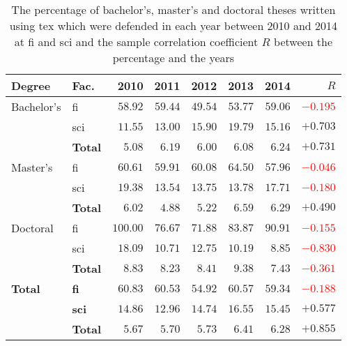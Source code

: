 \begin{table}
  \caption{The percentage of bachelor's, master's and doctoral theses written using \gls{tex} which were defended in each year between 2010 and 2014 at \acrshort{fi} and \acrshort{sci} and the sample correlation coefficient $R$ between the percentage and the years}
  \begin{tabularx}{\textwidth}{Xlrrrrrr}
    \textbf{Degree} & \textbf{Fac.} & \textbf{2010} & \textbf{2011} & \textbf{2012} & \textbf{2013} & \textbf{2014} & $R$\\
    \hline
    Bachelor's
      & \acrshort{fi}  & $58.92$ & $59.44$ & $49.54$ & $53.77$ & $59.06$ & \textcolor{red}{$-0.195$} \\
      & \acrshort{sci} & $11.55$ & $13.00$ & $15.90$ & $19.79$ & $15.16$ & \textcolor{OliveGreen}{$+0.703$} \\
      & \textbf{Total} & $\mathbf{5.08}$ & $\mathbf{6.19}$ & $\mathbf{6.00}$ & $\mathbf{6.08}$ & $\mathbf{6.24}$ & \textcolor{OliveGreen}{$\mathbf{+0.731}$} \\
    Master's
      & \acrshort{fi}  & $60.61$ & $59.91$ & $60.08$ & $64.50$ & $57.96$ & \textcolor{red}{$-0.046$} \\
      & \acrshort{sci} & $19.38$ & $13.54$ & $13.75$ & $13.78$ & $17.71$ & \textcolor{red}{$-0.180$} \\
      & \textbf{Total} & $\mathbf{6.02}$ & $\mathbf{4.88}$ & $\mathbf{5.22}$ & $\mathbf{6.59}$ & $\mathbf{6.29}$ &  \textcolor{OliveGreen}{$\mathbf{+0.490}$} \\
    Doctoral
      & \acrshort{fi}  & $100.00$ & $76.67$ & $71.88$ & $83.87$ & $90.91$ & \textcolor{red}{$-0.155$} \\
      & \acrshort{sci} & $18.09$  & $10.71$ & $12.75$ & $10.19$ & $8.85$ & \textcolor{red}{$-0.830$} \\
      & \textbf{Total} & $\mathbf{8.83}$ & $\mathbf{8.23}$ & $\mathbf{8.41}$ & $\mathbf{9.38}$ & $\mathbf{7.43}$ & \textcolor{red}{$\mathbf{-0.361}$} \\
    \hline
    \textbf{Total} 
      & \textbf{\acrshort{fi} } & $\mathbf{60.83}$ & $\mathbf{60.53}$ & $\mathbf{54.92}$ & $\mathbf{60.57}$ & $\mathbf{59.34}$ & \textcolor{red}{$\mathbf{-0.188}$} \\
      & \textbf{\acrshort{sci}} & $\mathbf{14.86}$ & $\mathbf{12.96}$ & $\mathbf{14.74}$ & $\mathbf{16.55}$ & $\mathbf{15.45}$ & \textcolor{OliveGreen}{$\mathbf{+0.577}$} \\
      & \textbf{Total} &$\mathbf{5.67}$ & $\mathbf{5.70}$ & $\mathbf{5.73}$ & $\mathbf{6.41}$ & $\mathbf{6.28}$ & \textcolor{OliveGreen}{$\mathbf{+0.855}$}
  \end{tabularx}
  \label{table:statistics-tex-yearly}
\end{table}
  
